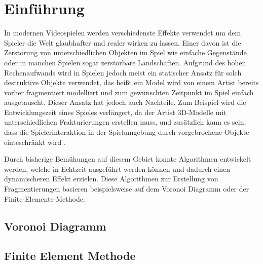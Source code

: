 \chapter{Einführung}

In modernen Videospielen werden verschiedenste Effekte verwendet um dem Spieler die Welt glaubhafter und realer wirken zu lassen.
Einer davon ist die Zerstörung von unterschiedlichen Objekten im Spiel wie einfache Gegenstände oder in manchen Spielen sogar zerstörbare Landschaften.
Aufgrund des hohen Rechenaufwands wird in Spielen jedoch meist ein statischer Ansatz für solch destruktive Objekte verwendet, das heißt ein Model wird von einem Artist 
bereits vorher fragmentiert modelliert und zum gewünschten Zeitpunkt im Spiel einfach ausgetauscht. Dieser Ansatz hat jedoch auch Nachteile. 
Zum Beispiel wird die Entwicklungszeit eines Spieles verlängert, da der Artist 3D-Modelle mit unterschiedlichen Frakturierungen erstellen muss,
und zusätzlich kann es sein, dass die Spielerinteraktion in der Spielumgebung durch vorgebrochene Objekte einteschränkt wird \cite{Najim.DynamicFracturing}.

Durch bisherige Bemühungen auf diesem Gebiet konnte Algorithmen entwickelt werden, welche in Echtzeit ausgeführt werden können und dadurch
einen dynamischeren Effekt erzielen. Diese Algorithmen zur Erstellung von Fragmentierungen basieren beispielsweise auf dem Voronoi Diagramm
oder der Finite-Elemente-Methode.



\cite{Schvartzman.FractureAnimationVoronoi}
\cite{Parker.Real-TimeDeformation}


\section{Voronoi Diagramm}

\section{Finite Element Methode}
